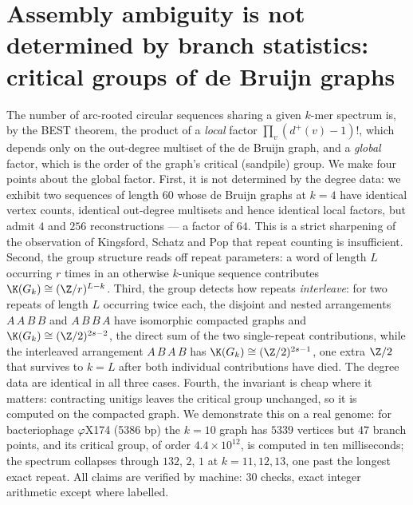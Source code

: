 \chapter[Critical groups of de Bruijn graphs]{Assembly ambiguity is not determined by branch statistics: critical groups of de Bruijn graphs}\label{chap:ch01}
\begin{chaptersummary}
The number of arc-rooted circular sequences sharing a given $k$-mer spectrum is, by the
BEST theorem, the product of a \emph{local} factor $\prod_v(d^+(v)-1)!$, which depends only
on the out-degree multiset of the de Bruijn graph, and a \emph{global} factor, which is the
order of the graph's critical (sandpile) group. We make four points about the global factor.
First, it is not determined by the degree data: we exhibit two sequences of length $60$
whose de Bruijn graphs at $k=4$ have identical vertex counts, identical out-degree
multisets and hence identical local factors, but admit $4$ and $256$ reconstructions --- a
factor of $64$. This is a strict sharpening of the observation of Kingsford, Schatz and Pop
that repeat counting is insufficient. Second, the group structure reads off repeat
parameters: a word of length $L$ occurring $r$ times in an otherwise $k$-unique sequence
contributes $\K(G_k)\cong(\Z/r)^{L-k}$. Third, the
group detects how repeats \emph{interleave}: for two repeats of length $L$ occurring twice
each, the disjoint and nested arrangements $A\,A\,B\,B$ and $A\,B\,B\,A$ have isomorphic
compacted graphs and $\K(G_k)\cong(\Z/2)^{2s-2}$, the direct sum of the two single-repeat
contributions, while the interleaved arrangement $A\,B\,A\,B$ has $\K(G_k)\cong(\Z/2)^{2s-1}$,
one extra $\Z/2$ that survives to $k=L$ after both individual contributions have died. The
degree data are identical in all three cases. Fourth, the invariant is cheap where it
matters: contracting unitigs leaves the critical group unchanged, so it is computed on the
compacted graph. We demonstrate this on a real genome: for bacteriophage $\varphi$X174
(5386 bp) the $k=10$ graph has $5339$ vertices but $47$ branch points, and its critical
group, of order $4.4\times10^{12}$, is computed in ten milliseconds; the spectrum collapses
through $132$, $2$, $1$ at $k=11,12,13$, one past the longest exact repeat. All claims are
verified by machine: $30$ checks, exact integer arithmetic except where labelled.
\end{chaptersummary}

